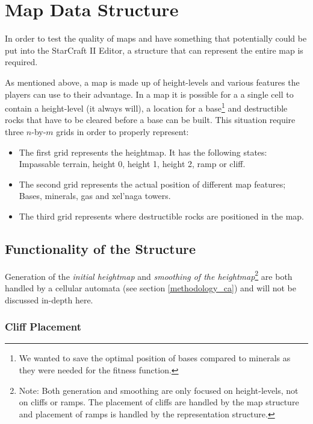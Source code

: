 \section{Map Data Structure}
\label{methodology_mapstructure}

In order to test the quality of maps and have something that potentially could be put into the StarCraft II Editor, a structure that can represent the entire map is required.

As mentioned above, a map is made up of height-levels and various features the players can use to their advantage. In a map it is possible for a a single cell to contain a height-level (it always will), a location for a base\footnote{We wanted to save the optimal position of bases compared to minerals as they were needed for the fitness function.} and destructible rocks that have to be cleared before a base can be built. This situation require three $n$-by-$m$ grids in order to properly represent:

\begin{itemize}

	\item The first grid represents the heightmap. It has the following states: Impassable terrain, height 0, height 1, height 2, ramp or cliff.

	\item The second grid represents the actual position of different map features; Bases, minerals, gas and xel'naga towers.

	\item The third grid represents where destructible rocks are positioned in the map.

\end{itemize}

\subsection{Functionality of the Structure}
\label{methodology_mapstructure_functionality}

Generation of the \textit{initial heightmap} and \textit{smoothing of the heightmap}\footnote{Note: Both generation and smoothing are only focused on height-levels, not on cliffs or ramps. The placement of cliffs are handled by the map structure and placement of ramps is handled by the representation structure.} are both handled by a cellular automata (see section \ref{methodology_ca}) and will not be discussed in-depth here.

\subsubsection*{Cliff Placement}

